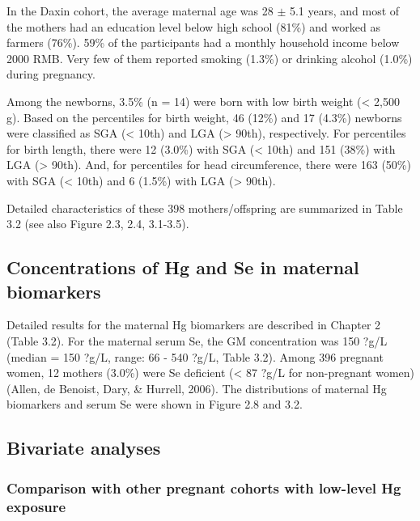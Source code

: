 In the Daxin cohort, the average maternal age was 28 ${\pm}$ 5.1 years, and most of the mothers had an education level below high school (81\%) and worked as farmers (76\%). 59\% of the participants had a monthly household income below 2000 RMB. Very few of them reported smoking (1.3\%) or drinking alcohol (1.0\%) during pregnancy. 

Among the newborns, 3.5\% (n = 14) were born with low birth weight (< 2,500 g). Based on the percentiles for birth weight, 46 (12\%) and 17 (4.3\%) newborns were classified as SGA (< 10th) and LGA (> 90th), respectively. For percentiles for birth length, there were 12 (3.0\%) with SGA (< 10th) and 151 (38\%) with LGA (> 90th). And, for percentiles for head circumference, there were 163 (50\%) with SGA (< 10th) and 6 (1.5\%) with LGA (> 90th).

Detailed characteristics of these 398 mothers/offspring are summarized in Table 3.2 (see also Figure 2.3, 2.4, 3.1-3.5).

\subsection{Concentrations of Hg and Se in maternal biomarkers}

Detailed results for the maternal Hg biomarkers are described in Chapter 2 (Table 3.2). For the maternal serum Se, the GM concentration was 150 ?g/L (median = 150 ?g/L, range: 66 - 540 ?g/L, Table 3.2). Among 396 pregnant women, 12 mothers (3.0\%) were Se deficient (< 87 ?g/L for non-pregnant women) (Allen, de Benoist, Dary, \& Hurrell, 2006). The distributions of maternal Hg biomarkers and serum Se were shown in Figure 2.8 and 3.2.

\subsection{Bivariate analyses}

\subsubsection {Comparison with other pregnant cohorts with low-level Hg exposure}

